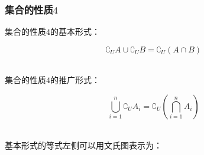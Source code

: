 \documentclass[UTF8]{ctexart}
\begin{document}
\subsubsection{集合的性质$4$}
    集合的性质$4$的基本形式：
    \begin{large}
        \begin{equation*}
            \complement_UA\cup\complement_UB=\complement_U\left(A\cap B\right)
        \end{equation*}
    \end{large}\\
    集合的性质$4$的推广形式：
    \begin{large}
        \begin{equation*}
            \bigcup_{i=1}^n \complement_UA_i=\complement_U\left(\bigcap_{i=1}^n A_i\right)
        \end{equation*}
    \end{large}\\[1mm]
    基本形式的等式左侧可以用文氏图表示为：\vspace{5pt}
\end{document}
